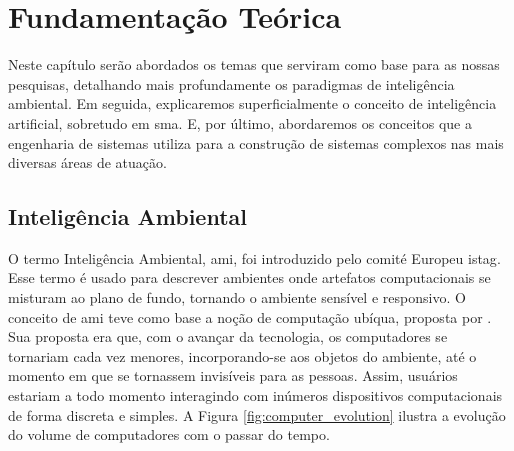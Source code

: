 \chapter{Fundamentação Teórica}
\label{cap:fundamentacao-teorica}

    Neste capítulo serão abordados os temas que serviram como base para as nossas pesquisas, detalhando mais profundamente os paradigmas de inteligência ambiental. Em seguida, explicaremos superficialmente o conceito de inteligência artificial, sobretudo em \acrlong{sma}. E, por último, abordaremos os conceitos que a engenharia de sistemas utiliza para a construção de sistemas complexos nas mais diversas áreas de atuação.

\section{Inteligência Ambiental}
\label{sec:inteligência-Ambiental}

    O termo Inteligência Ambiental, \acrshort{ami}, foi introduzido  pelo comité Europeu \acrfull{istag}. Esse termo é usado para descrever ambientes onde artefatos computacionais se misturam ao plano de fundo, tornando o ambiente sensível e responsivo. O conceito de \acrshort{ami} teve como base a noção de  computação ubíqua, proposta por . Sua proposta era que, com o avançar da tecnologia, os computadores se tornariam cada vez menores, incorporando-se aos objetos do ambiente, até o momento em que se tornassem invisíveis para as pessoas. Assim, usuários estariam a todo momento interagindo com inúmeros dispositivos computacionais de forma discreta e simples. A Figura \ref{fig:computer_evolution} ilustra a evolução do volume de computadores com o passar do tempo.
    
    \begin{figure}[ht!]
        \centering
    \end{figure}
    

